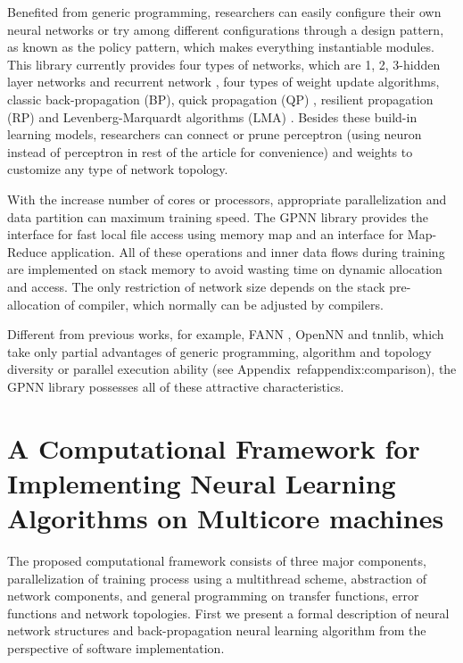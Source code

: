 \documentclass[procedia]{easychair}
\begin{document}
Benefited from generic programming, researchers can easily configure their own neural networks or try among different configurations through a design pattern, as known as the policy pattern, which makes everything instantiable modules.  This library currently provides four types of networks, which are 1, 2, 3-hidden layer networks and recurrent network \cite{boden2001guide}, four types of weight update algorithms, classic back-propagation (BP), quick propagation (QP) \cite{fahlman1988empirical}, resilient propagation (RP) \cite{riedmiller1993direct} and Levenberg-Marquardt algorithms (LMA) \cite{hagan1994training}.  Besides these build-in learning models, researchers can connect or prune perceptron (using neuron instead of perceptron in rest of the article for convenience) and weights to customize any type of network topology.

With the increase number of cores or processors, appropriate parallelization and data partition can maximum training speed.  The GPNN library provides the interface for fast local file access using memory map and an interface for Map-Reduce application.  All of these operations and inner data flows during training are implemented on stack memory to avoid wasting time on dynamic allocation and access.  The only restriction of network size depends on the stack pre-allocation of compiler, which normally can be adjusted by compilers.

Different from previous works, for example, FANN \cite{nissen2003implementation}, OpenNN \cite{lopezopennn} and tnnlib, which take only partial advantages of generic programming, algorithm and topology diversity or parallel execution ability (see Appendix~ref{appendix:comparison}), the GPNN library possesses all of these attractive characteristics.


\section{A Computational Framework for Implementing Neural Learning Algorithms on Multicore machines}
\label{section:implementation}

The proposed computational framework consists of three major components, parallelization of training process using a multithread scheme, abstraction of network components, and general programming on transfer functions, error functions and network topologies.  First we present a formal description of neural network structures and back-propagation neural learning algorithm from the perspective of software implementation.
\end{document}
